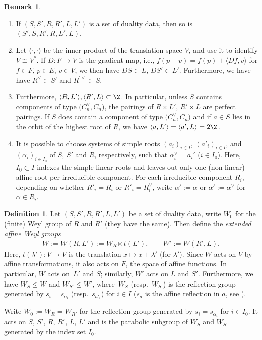 \documentclass[pdftex]{sigma}
\theoremstyle{definition}
\newtheorem{Definition}[Theorem]{Definition}
\newtheorem{Remark}[Theorem]{Remark}
\numberwithin{equation}{section}
\begin{document}
\begin{Remark}\qquad
\begin{enumerate}\itemsep=0pt
 \item[(i)]
 If $(S,S',R,R',L,L')$ is a set of duality data, then so is
 $(S',S,R',R,L',L)$.
 \item[(ii)]
 Let $\langle\cdot,\cdot\rangle$ be the inner product of the translation
 space $V$, and use it to identify $V\cong V^*$. If $D\colon F\to V$ is the gradient map, i.e.,
 $f(p+v)=f(p) + \langle Df, v\rangle$ for $f\in F$, $p\in E$, $v\in V$, we then have $DS\subset L$, $DS'\subset L'$. Furthermore, we have
 have $R^\vee\subset S'$ and $R^{\prime\vee}\subset S$.
 \item[(iii)]
 Furthermore, $\langle R, L'\rangle,\langle R',L\rangle\subset\Z$. In
 particular, unless $S$ contains components of type $\bigl(C_n^\vee, C_n\bigr)$, the pairings of $R\times L'$, $R'\times L$ are
 perfect pairings. If $S$ does contain a component of type $\bigl(C_n^\vee, C_n\bigr)$ and if $a\in S$ lies in the orbit of the
 highest root of $R$, we have $\langle a, L'\rangle=\langle a',L\rangle=2\Z$.
 \item[(iv)]
 It is possible to choose systems of simple roots $(a_i)_{i\in I}$, $(a'_i)_{i\in I}$, and
 $(\alpha_i)_{i\in I_0}$ of $S$, $S'$ and $R$, respectively, such that $\alpha_i^\vee=a_i'$ ($i\in I_0$). Here, $I_0\subset I$ indexes the
 simple linear roots and leaves out only one (non-linear) affine root per
 irreducible component. For each irreducible component $R_i$, depending on whether $R'_i=R_i$ or $R'_i=R_i^\vee$, write
 $\alpha':=\alpha$ or $\alpha':=\alpha^\vee$ for~${\alpha\in R_i}$.
\end{enumerate}
\end{Remark}

\begin{Definition}
 Let $(S,S',R,R',L,L')$ be a set of duality data, write
 $W_0$ for the (finite) Weyl group of $R$ and $R'$ (they have the same).
 Then define the \emph{extended affine Weyl groups}
 \begin{align*}
 W:= W(R,L') := W_R\ltimes t(L'),\qquad
 W':= W(R',L).
 \end{align*}
 Here, $t(\lambda')\colon V\to V$ is the translation $x\mapsto x + \lambda'$
 (for $\lambda'$). Since $W$ acts on $V$ by affine transformations,
 it also acts on $F$, the space of affine functions. In particular,
 $W$ acts on~$L'$ and $S$; similarly, $W'$ acts on $L$ and $S'$. Furthermore, we have
 $W_S\le W$ and $W_{S'}\le W'$, where~$W_S$ (resp.\ $W_{S'}$)
 is the reflection group generated by $s_i=s_{a_i}$ (resp.\ $s_{a'_i}$)
 for $i\in I$ ($s_a$ is the affine reflection in $a$, see \cite[Section~1.1.6]{macdonald}).

 Write $W_0:= W_{R}=W_{R'}$ for the reflection group generated by $s_i = s_{\alpha_i}$ for $i\in I_0$. It acts on $S$, $S'$, $R$, $R'$, $L$, $L'$ and is
 the parabolic subgroup of $W_S$ and $W_{S'}$ generated by the
 index set $I_0$.
\end{Definition}
\end{document}
